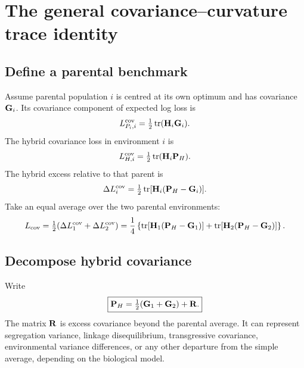 \chapter{The general covariance--curvature trace identity}

\section{Define a parental benchmark}

Assume parental population \(i\) is centred at its own optimum and has covariance \(\mathbf{G}_i\). Its covariance component of expected log loss is
\begin{equation}
L_{P_i,i}^{\mathrm{cov}}=\tfrac12\operatorname{tr}(\mathbf{H}_i\mathbf{G}_i).
\end{equation}
The hybrid covariance loss in environment \(i\) is
\begin{equation}
L_{H,i}^{\mathrm{cov}}=\tfrac12\operatorname{tr}(\mathbf{H}_i\mathbf{P}_H).
\end{equation}
The hybrid excess relative to that parent is
\begin{equation}
\Delta L_i^{\mathrm{cov}}
=\tfrac12\operatorname{tr}[\mathbf{H}_i(\mathbf{P}_H-\mathbf{G}_i)].
\end{equation}
Take an equal average over the two parental environments:
\begin{equation}
L_{\mathrm{cov}}
=\tfrac12(\Delta L_1^{\mathrm{cov}}+\Delta L_2^{\mathrm{cov}})
=\frac14\left
\{\operatorname{tr}[\mathbf{H}_1(\mathbf{P}_H-\mathbf{G}_1)]
+\operatorname{tr}[\mathbf{H}_2(\mathbf{P}_H-\mathbf{G}_2)]\right\}.
\label{eq:covLoadBenchmark}
\end{equation}

\section{Decompose hybrid covariance}

Write
\begin{equation}
\boxed{\mathbf{P}_H=\tfrac12(\mathbf{G}_1+\mathbf{G}_2)+\mathbf{R}.}
\label{eq:hybridCovDecomposition}
\end{equation}
The matrix \(\mathbf{R}\) is excess covariance beyond the parental average. It can represent segregation variance, linkage disequilibrium, transgressive covariance, environmental variance differences, or any other departure from the simple average, depending on the biological model.

